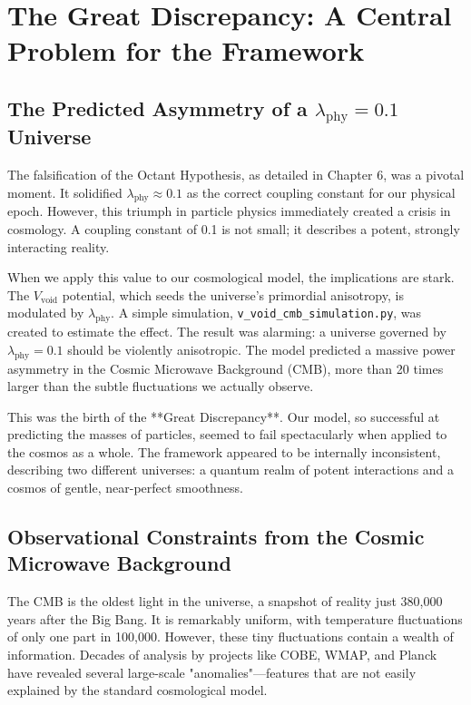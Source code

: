 \documentclass[12pt]{report}
\begin{document}
\chapter{The Great Discrepancy: A Central Problem for the Framework}

\section{The Predicted Asymmetry of a \texorpdfstring{$\lambda_{\text{phy}} = 0.1$}{λ_phy = 0.1} Universe}
The falsification of the Octant Hypothesis, as detailed in Chapter 6, was a pivotal moment. It solidified $\lambda_{\text{phy}} \approx 0.1$ as the correct coupling constant for our physical epoch. However, this triumph in particle physics immediately created a crisis in cosmology. A coupling constant of 0.1 is not small; it describes a potent, strongly interacting reality.

When we apply this value to our cosmological model, the implications are stark. The $V_{\text{void}}$ potential, which seeds the universe's primordial anisotropy, is modulated by $\lambda_{\text{phy}}$. A simple simulation, \texttt{v\_void\_cmb\_simulation.py}, was created to estimate the effect. The result was alarming: a universe governed by $\lambda_{\text{phy}} = 0.1$ should be violently anisotropic. The model predicted a massive power asymmetry in the Cosmic Microwave Background (CMB), more than 20 times larger than the subtle fluctuations we actually observe.

This was the birth of the **Great Discrepancy**. Our model, so successful at predicting the masses of particles, seemed to fail spectacularly when applied to the cosmos as a whole. The framework appeared to be internally inconsistent, describing two different universes: a quantum realm of potent interactions and a cosmos of gentle, near-perfect smoothness.

\section{Observational Constraints from the Cosmic Microwave Background}
The CMB is the oldest light in the universe, a snapshot of reality just 380,000 years after the Big Bang. It is remarkably uniform, with temperature fluctuations of only one part in 100,000. However, these tiny fluctuations contain a wealth of information. Decades of analysis by projects like COBE, WMAP, and Planck have revealed several large-scale "anomalies"—features that are not easily explained by the standard cosmological model.
\end{document}
